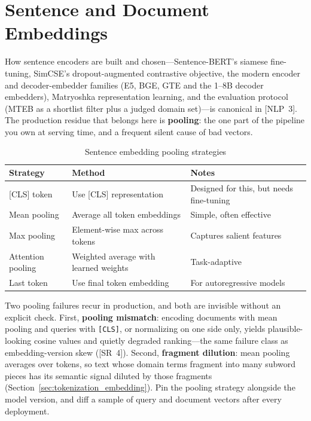 \section{Sentence and Document Embeddings}
\label{sec:sentence_embeddings}

How sentence encoders are built and chosen---Sentence-BERT's siamese fine-tuning, SimCSE's dropout-augmented contrastive objective, the modern encoder and decoder-embedder families (E5, BGE, GTE and the 1--8B decoder embedders), Matryoshka representation learning, and the evaluation protocol (MTEB as a shortlist filter plus a judged domain set)---is canonical in [NLP~3]. The production residue that belongs here is \textbf{pooling}: the one part of the pipeline you own at serving time, and a frequent silent cause of bad vectors.

\begin{table}[H]
\centering
\caption{Sentence embedding pooling strategies}
\begin{tabularx}{\textwidth}{lXX}
\toprule
\textbf{Strategy} & \textbf{Method} & \textbf{Notes} \\
\midrule
{[CLS]} token & Use {[CLS]} representation & Designed for this, but needs fine-tuning \\
Mean pooling & Average all token embeddings & Simple, often effective \\
Max pooling & Element-wise max across tokens & Captures salient features \\
Attention pooling & Weighted average with learned weights & Task-adaptive \\
Last token & Use final token embedding & For autoregressive models \\
\bottomrule
\end{tabularx}
\end{table}

Two pooling failures recur in production, and both are invisible without an explicit check. First, \textbf{pooling mismatch}: encoding documents with mean pooling and queries with \texttt{[CLS]}, or normalizing on one side only, yields plausible-looking cosine values and quietly degraded ranking---the same failure class as embedding-version skew ([SR~4]). Second, \textbf{fragment dilution}: mean pooling averages over tokens, so text whose domain terms fragment into many subword pieces has its semantic signal diluted by those fragments (Section~\ref{sec:tokenization_embedding}). Pin the pooling strategy alongside the model version, and diff a sample of query and document vectors after every deployment.

